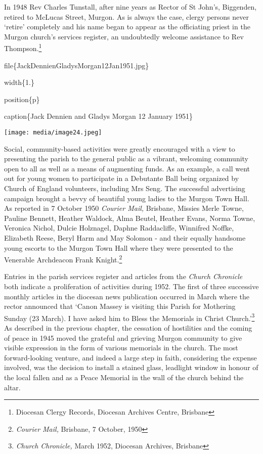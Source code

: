 In 1948 Rev Charles Tunstall, after nine years as Rector of St John's, Biggenden, retired to McLucas Street, Murgon. As is always the case, clergy persons never `retire' completely and his name began to appear as the officiating priest in the Murgon church's services register, an undoubtedly welcome assistance to Rev Thompson.\footnote{Diocesan Clergy Records, Diocesan Archives Centre, Brisbane}

file\{JackDennienGladysMorgan12Jan1951.jpg\}

width\{1.\}

position\{p\}

caption\{Jack Dennien and Gladys Morgan 12 January 1951\}

\texttt{[image: media/image24.jpeg]}

Social, community-based activities were greatly encouraged with a view to presenting the parish to the general public as a vibrant, welcoming community open to all as well as a means of augmenting funds. As an example, a call went out for young women to participate in a Debutante Ball being organized by Church of England volunteers, including Mrs Seng. The successful advertising campaign brought a bevvy of beautiful young ladies to the Murgon Town Hall. As reported in 7 October 1950 \emph{Courier Mail,} Brisbane, Missies Merle Towne, Pauline Bennett, Heather Waldock, Alma Beutel, Heather Evans, Norma Towne, Veronica Nichol, Dulcie Holznagel, Daphne Raddacliffe, Winnifred Noffke, Elizabeth Reese, Beryl Harm and May Solomon - and their equally handsome young escorts to the Murgon Town Hall where they were presented to the Venerable Archdeacon Frank Knight.\footnote{\emph{Courier Mail,} Brisbane, 7 October, 1950}

Entries in the parish services register and articles from the \emph{Church Chronicle} both indicate a proliferation of activities during 1952. The first of three successive monthly articles in the diocesan news publication occurred in March where the rector announced that `Canon Massey is visiting this Parish for Mothering Sunday (23 March). I have asked him to Bless the Memorials in Christ Church.'\footnote{\emph{Church Chronicle,} March 1952, Diocesan Archives, Brisbane} As described in the previous chapter, the cessation of hostilities and the coming of peace in 1945 moved the grateful and grieving Murgon community to give visible expression in the form of various memorials in the church. The most forward-looking venture, and indeed a large step in faith, considering the expense involved, was the decision to install a stained glass, leadlight window in honour of the local fallen and as a Peace Memorial in the wall of the church behind the altar.

